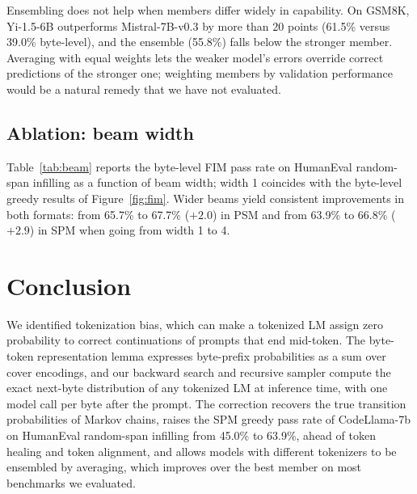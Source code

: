 \documentclass{article} %
\begin{document}
Ensembling does not help when members differ widely in capability. On GSM8K, Yi-1.5-6B outperforms Mistral-7B-v0.3 by more than 20 points (61.5\% versus 39.0\% byte-level), and the ensemble (55.8\%) falls below the stronger member. Averaging with equal weights lets the weaker model's errors override correct predictions of the stronger one; weighting members by validation performance would be a natural remedy that we have not evaluated.

\subsection{Ablation: beam width}
\label{sec:exp_ablation}
Table~\ref{tab:beam} reports the byte-level FIM pass rate on HumanEval random-span infilling as a function of beam width; width 1 coincides with the byte-level greedy results of Figure~\ref{fig:fim}. Wider beams yield consistent improvements in both formats: from 65.7\% to 67.7\% ($+2.0$) in PSM and from 63.9\% to 66.8\% ($+2.9$) in SPM when going from width 1 to 4.


\section{Conclusion}
\label{sec:conclusion}
We identified tokenization bias, which can make a tokenized LM assign zero probability to correct continuations of prompts that end mid-token. The byte-token representation lemma expresses byte-prefix probabilities as a sum over cover encodings, and our backward search and recursive sampler compute the exact next-byte distribution of any tokenized LM at inference time, with one model call per byte after the prompt. The correction recovers the true transition probabilities of Markov chains, raises the SPM greedy pass rate of CodeLlama-7b on HumanEval random-span infilling from 45.0\% to 63.9\%, ahead of token healing and token alignment, and allows models with different tokenizers to be ensembled by averaging, which improves over the best member on most benchmarks we evaluated.
\end{document}
